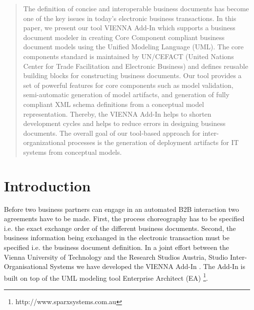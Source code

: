 \documentclass{acm_proc_article-sp}
\begin{document}
\maketitle
\begin{abstract}

The definition of concise and interoperable business documents has become one of the key issues in today's electronic business transactions. 
In this paper, we present our tool VIENNA Add-In which supports a business document modeler in creating Core Component compliant business document models using the Unified Modeling Language (UML). The core components standard is maintained by UN/CEFACT (United Nations Center for Trade Facilitation and Electronic Business) and defines reusable building blocks for constructing business documents. 
Our tool provides a set of powerful features for core components such as model validation, semi-automatic generation of model artifacts, and generation of fully compliant XML schema definitions from a conceptual model representation. Thereby, the VIENNA Add-In helps to shorten development cycles and helps to reduce errors in designing business documents. The overall goal of our tool-based approach for inter-organizational processes is the generation of deployment artifacts for IT systems from conceptual models.


\end{abstract}





\section{Introduction}

Before two business partners can engage in an automated B2B interaction two agreements have to be made. First, the process choreography has to be specified i.e. the exact exchange order of the different business documents. Second, the business information being exchanged in the electronic transaction must be specified i.e. the business document definition. In a joint effort between the Vienna University of Technology and the Research Studios Austria, Studio Inter-Organisational Systems we have developed the VIENNA Add-In \cite{man:VIENNAAddIn}. The Add-In is built on top of the UML modeling tool Enterprise Architect (EA) \footnote{http://www.sparxsystems.com.au}.
\end{document}
